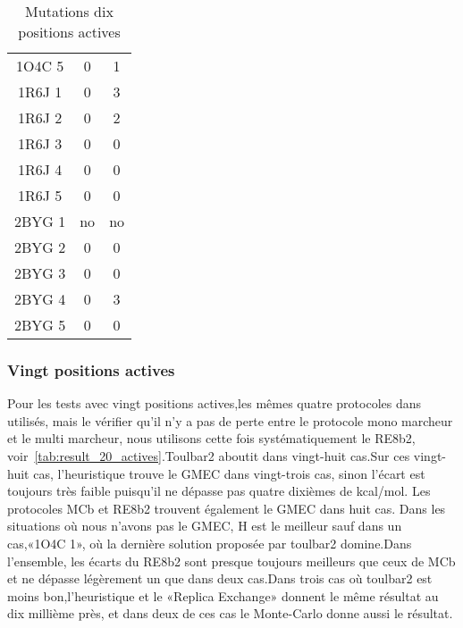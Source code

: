 \begin{table}[h]
{\begin{tabular}{ccc}
        1O4C 5 & 0  & 1 \\
        1R6J 1 & 0  & 3 \\
        1R6J 2 & 0  & 2 \\
        1R6J 3 & 0  & 0 \\
        1R6J 4 & 0  & 0 \\
        1R6J 5 & 0  & 0 \\
        2BYG 1 & no & no \\ 
        2BYG 2 & 0  & 0 \\
        2BYG 3 & 0  & 0 \\
        2BYG 4 & 0  & 3 \\
        2BYG 5 & 0  & 0 \\        
        \bottomrule

 \end{tabular}      
}
 \caption{Mutations dix positions actives }
\label{tab:mutations_10_actives}
\end{table}

   \subsubsection{Vingt positions actives }

Pour les  tests avec vingt positions actives,les mêmes quatre protocoles dans utilisés, mais le vérifier qu'il n'y a pas de perte entre le protocole mono marcheur et le multi marcheur, nous utilisons cette fois systématiquement le RE8b2, voir~\ref{tab:result_20_actives}.Toulbar2 aboutit dans vingt-huit cas.Sur ces vingt-huit cas, l'heuristique trouve le GMEC dans vingt-trois cas, sinon l'écart est toujours très faible puisqu'il ne dépasse pas quatre dixièmes de kcal/mol. Les protocoles MCb et RE8b2 trouvent également le GMEC dans huit cas. Dans les situations où nous n'avons pas le GMEC, H est le meilleur sauf dans un cas,«1O4C 1», où la dernière solution proposée par toulbar2 domine.Dans l'ensemble, les écarts du RE8b2 sont presque toujours meilleurs que ceux de MCb et ne dépasse légèrement un que dans deux cas.Dans trois cas où toulbar2 est moins bon,l'heuristique et le «Replica Exchange» donnent le même résultat au dix millième près, et dans deux de ces cas le Monte-Carlo donne aussi le résultat.  


